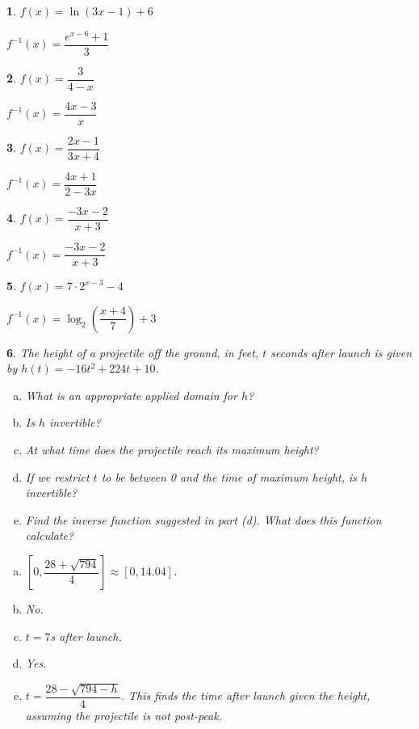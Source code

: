 \documentclass{amsbook}
\newcommand{\ssp}{\begin{enumerate}[(a), leftmargin=*]}
\newcommand{\esp}{\end{enumerate}}
\newtheorem{exc}{}
\newenvironment{ex}{\begin{exc}\normalfont}{\end{exc}}
\numberwithin{section}{chapter}
\numberwithin{equation}{chapter}
\begin{document}
\begin{multicols}{2}
\begin{ex}
	$f(x) = \ln (3x-1)+6$
	\begin{sol}
		$f^{-1}(x) = \dfrac{e^{x-6}+1}{3}$	
	\end{sol}
\end{ex}


\begin{ex}
	$f(x) = \dfrac{3}{4-x}$
	\begin{sol}
		$f^{-1}(x) = \dfrac{4x-3}{x}$
	\end{sol}
\end{ex}

\begin{ex}
	$f(x) = \dfrac{2x-1}{3x+4}$
	\begin{sol}
		$f^{-1}(x) = \dfrac{4x+1}{2-3x}$
	\end{sol}
\end{ex}

\begin{ex}
	$f(x) = \dfrac{-3x - 2}{x + 3}$ 
	\begin{sol}
	$f^{-1}(x) = \dfrac{-3x - 2}{x + 3}$	
	\end{sol}
\end{ex}

\begin{ex}
	$f(x) = 7\cdot 2^{x-3}-4$
	\begin{sol}
		$f^{-1}(x) = \log_2\left(\dfrac{x+4}{7}\right)+3$	
	\end{sol}
\end{ex}

\end{multicols}

\begin{ex}
	The height of a projectile off the ground, in feet, $t$ seconds after launch is given by $h(t) = -16t^2+224t+10$.
	\ssp
	\item What is an appropriate applied domain for $h$?
	\item Is $h$ invertible?
	\item At what time does the projectile reach its maximum height?
	\item If we restrict $t$ to be between 0 and the time of maximum height, is $h$ invertible?
	\item Find the inverse function suggested in part (d). What does this function calculate?
	\esp
	\begin{sol}
	\ssp
	\item $ \left[0, \dfrac{28+\sqrt{794}}{4}\right] \approx [0, 14.04]$.
	\item No.
	\item $t=7$s after launch.
	\item Yes.
	\item $t = \dfrac{28-\sqrt{794-h}}{4}$. This finds the time after launch given the height, assuming the projectile is not post-peak. 
	\esp		
	\end{sol}
\end{ex}
\end{document}
